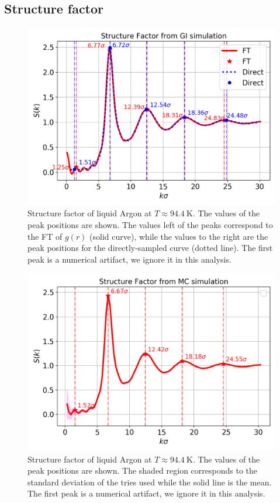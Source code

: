 \documentclass[%
aps,
pra,%
amsmath,amssymb,
preprint,%
reprint,%
notitlepage,
a4paper]{revtex4-1}
\begin{document}
\subsection{Structure factor}
\begin{figure}
	\centering
	\includegraphics[width=0.9\linewidth]{../task2/results/sofk}
	\caption{Structure factor of liquid Argon at $T\approx\SI{94.4}{\kelvin}$. The values of the peak positions are shown. The values left of the peaks correspond to the FT of $g(r)$ (solid curve), while the values to the right are the peak positions for the directly-sampled curve (dotted line). The first peak is a numerical artifact, we ignore it in this analysis.}
	\label{fig:sofk}
\end{figure}
\begin{figure}
	\centering
	\includegraphics[width=0.9\linewidth]{../task2/results/sofk_mc}
	\caption{Structure factor of liquid Argon at $T\approx\SI{94.4}{\kelvin}$. The values of the peak positions are shown. The shaded region corresponds to the standard deviation of the tries used while the solid line is the mean. The first peak is a numerical artifact, we ignore it in this analysis.}
	\label{fig:sofk_mc}
\end{figure}
\end{document}

